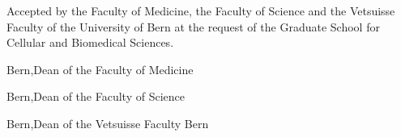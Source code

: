\thispagestyle{empty}
\hfill\vfill
\noindent Accepted by the Faculty of Medicine, the Faculty of Science and the Vetsuisse Faculty of the University of Bern at the request of the Graduate School for Cellular and Biomedical Sciences.

\vspace{2.5cm}
\noindent Bern,\hfill Dean of the Faculty of Medicine

\vspace{2.5cm}
\noindent Bern,\hfill Dean of the Faculty of Science

\vspace{2.5cm}
\noindent Bern,\hfill Dean of the Vetsuisse Faculty Bern\\